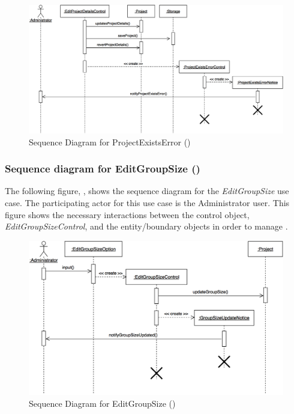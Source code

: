 \documentclass[12pt,letterpaper]{article}
\begin{document}
\begin{figure}[H]
	\centering{}
	\includegraphics[scale=0.25]{imgs/seq/project-exists-error.png}
	\caption[ - Sequence Diagram for ProjectExistsError]{Sequence Diagram for ProjectExistsError ()}
\end{figure}

\subsubsection*{Sequence diagram for EditGroupSize ()}

The following figure, , shows the sequence diagram for the {\it EditGroupSize} use case. The participating actor for this use case is
the Administrator user. This figure shows the necessary interactions between the control object, {\it EditGroupSizeControl}, and the
entity/boundary objects in order to manage .

\begin{figure}[H]
	\centering{}
	\includegraphics[scale=0.27]{imgs/seq/edit-group-size.png}
	\caption[ - Sequence Diagram for EditGroupSize]{Sequence Diagram for EditGroupSize ()}
\end{figure}
\end{document}
